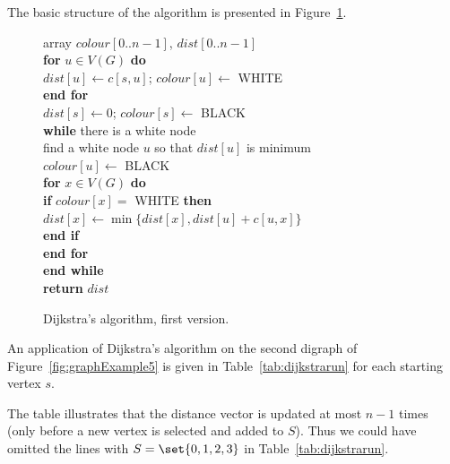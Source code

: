 The basic structure of the algorithm is presented in
Figure~\ref{fig:dijkstra-alg}.

\begin{figure}
\hspace*{.6in}\begin{minipage}{5in}
{
\> array $colour[0..n-1]$, $dist[0..n-1]$ \\
\> \textbf{for} $u\in V(G)$ \textbf{do} \\
\> \> $dist[u] \gets c[s,u]$; $colour[u] \gets$ WHITE  \\
\> \textbf{end for} \\
\> $dist[s] \gets 0$; $colour[s] \gets $ BLACK\\
\> \textbf{while}  there is a white node  \\
\> \> find a white node $u$ so that $dist[u]$ is minimum\\
\> \> $colour[u] \gets $ BLACK \\
\> \> \textbf{for}  $x \in V(G)$ \textbf{do}\\
\> \> \> \textbf{if} $colour[x] = $ WHITE  \textbf{then} \\
\> \> \> \> $dist[x] \gets \min \{dist[x], dist[u] + c[u,x]\}$\\  
\> \> \> \textbf{end if} \\
\> \> \textbf{end for} \\
\> \textbf{end while} \\
\> \textbf{return} $dist$\\ 
}
\end{minipage}
\caption{Dijkstra's algorithm, first version.}
\label{fig:dijkstra-alg}
\end{figure}


\begin{Example}
\label{eg:dijkstra}
An application of Dijkstra's algorithm on the second digraph
of Figure~\ref{fig:graphExample5} is given in Table~\ref{tab:dijkstrarun}
for each starting vertex $s$.

The table illustrates that the distance vector is updated at 
most $n - 1$ times (only before a new vertex is selected and added to $S$). 
Thus we could have omitted the lines with $S=\set{0,1,2,3}$ in 
Table~\ref{tab:dijkstrarun}.
\end{Example}


